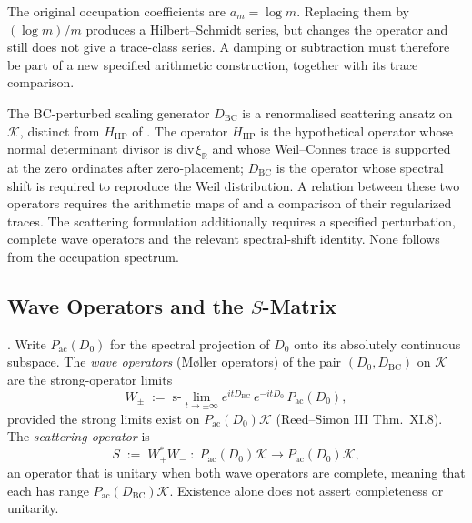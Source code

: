 The original occupation coefficients are \(a_m=\log m\).
Replacing them by \((\log m)/m\) produces a Hilbert--Schmidt series,
but changes the operator and still does not give a trace-class series.
A damping or subtraction must therefore be part of a new specified
arithmetic construction, together with its trace comparison.

\begin{remark}
\label{v4-arith:w7-j:rem:relation-to-HHP}
The BC-perturbed scaling generator \(D_{\mathrm{BC}}\) is a
renormalised scattering ansatz on \(\mathcal{K}\), distinct from
\(H_{\mathrm{HP}}\) of .
The operator \(H_{\mathrm{HP}}\) is the hypothetical operator whose
normal determinant divisor is \(\mathrm{div}\,\xi_{\mathbb R}\) and
whose Weil--Connes trace is supported at the zero ordinates after
zero-placement; \(D_{\mathrm{BC}}\) is the operator whose spectral
shift is required to reproduce the Weil distribution.
A relation between these two operators requires the arithmetic maps of
 and a comparison of their
regularized traces. The scattering formulation additionally requires a
specified perturbation, complete wave operators and the relevant
spectral-shift identity. None follows from the occupation spectrum.
\end{remark}

\subsection{Wave Operators and the \(S\)-Matrix}
\label{v4-arith:w7-j:framework:S-matrix}

\begin{definition}
\label{v4-arith:w7-j:def:wave-operators}
\ClaimStatusDefinitional. Write \(P_{\mathrm{ac}}(D_{0})\) for the
spectral projection of \(D_{0}\) onto its absolutely continuous
subspace. The \emph{wave operators} (M\o{}ller operators) of the pair
\((D_{0},D_{\mathrm{BC}})\) on \(\mathcal{K}\) are the strong-operator
limits
\begin{equation}
\label{v4-arith:w7-j:eq:wave-operators}
W_{\pm}\;:=\;\mathrm{s}\text{-}\lim_{t\to\pm\infty}e^{itD_{\mathrm{BC}}}\,e^{-itD_{0}}\,P_{\mathrm{ac}}(D_{0}),
\end{equation}
provided the strong limits exist on \(P_{\mathrm{ac}}(D_{0})\mathcal{K}\)
(Reed--Simon III Thm.~XI.8). The \emph{scattering operator} is
\begin{equation}
\label{v4-arith:w7-j:eq:S-operator}
S\;:=\;W_{+}^{*}W_{-}\;:\;P_{\mathrm{ac}}(D_{0})\mathcal{K}\to P_{\mathrm{ac}}(D_{0})\mathcal{K},
\end{equation}
an operator that is unitary when both wave operators are complete,
meaning that each has range \(P_{\mathrm{ac}}(D_{\mathrm{BC}})\mathcal K\).
Existence alone does not assert completeness or unitarity.
\end{definition}

